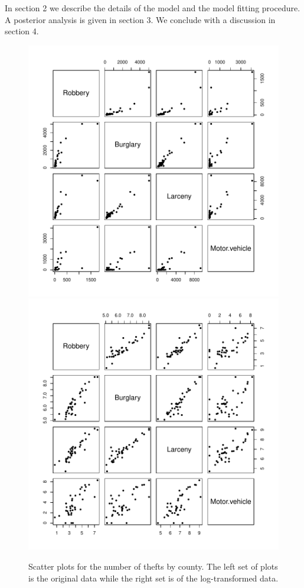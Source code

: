 \documentclass{asaproc}
\begin{document}
In section 2 we describe the details of the model and the model fitting procedure. A posterior analysis is given in section 3. We conclude with a discussion in section 4.

\begin{figure}[ht]
\centering
\includegraphics[scale=0.55]{figs/data.pdf}
\includegraphics[scale=0.55]{figs/data_log.pdf}
\caption{Scatter plots for the number of thefts by county. The left set of plots is the original data while the right set is of the log-transformed data.}
\label{data}
\end{figure}
\end{document}
